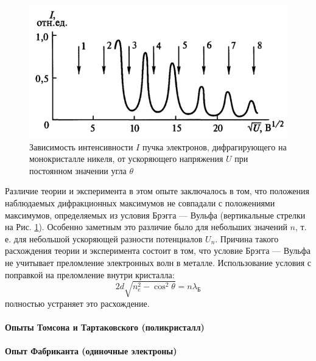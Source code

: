 \begin{figure}[H]
	\centering
	\includegraphics[width=0.6\linewidth]{img/oral-05/devison-djermer-intensivnost-u}
	\caption{Зависимость интенсивности $I$ пучка электронов, дифрагирующего на монокристалле никеля, от ускоряющего напряжения $U$ при постоянном значении угла $\theta$}
	\label{fig:devison-djermer-intensivnost-u}
\end{figure}
Различие теории и эксперимента в этом опыте заключалось в том, что положения наблюдаемых дифракционных максимумов не совпадали с положениями максимумов, определяемых из условия Брэгга — Вульфа (вертикальные стрелки на Рис. \ref{fig:devison-djermer-intensivnost-u}). Особенно заметным это различие было для небольших значений $n$, т. е. для небольшой ускоряющей разности потенциалов $U_n$. Причина такого расхождения теории и эксперимента состоит в том, что условие Брэгга — Вульфа не учитывает преломление электронных волн в металле. 
Использование условия с поправкой на преломление внутри кристалла:
\begin{equation*}
	2d\sqrt{n_e^2-\cos^2\theta}=n\lambda_{\text{Б}}
\end{equation*}
полностью устраняет это расхождение.



\newpage
\paragraph{Опыты Томсона  и Тартаковского (поликристалл)}

\newpage
\paragraph{Опыт Фабриканта (одиночные электроны)}

